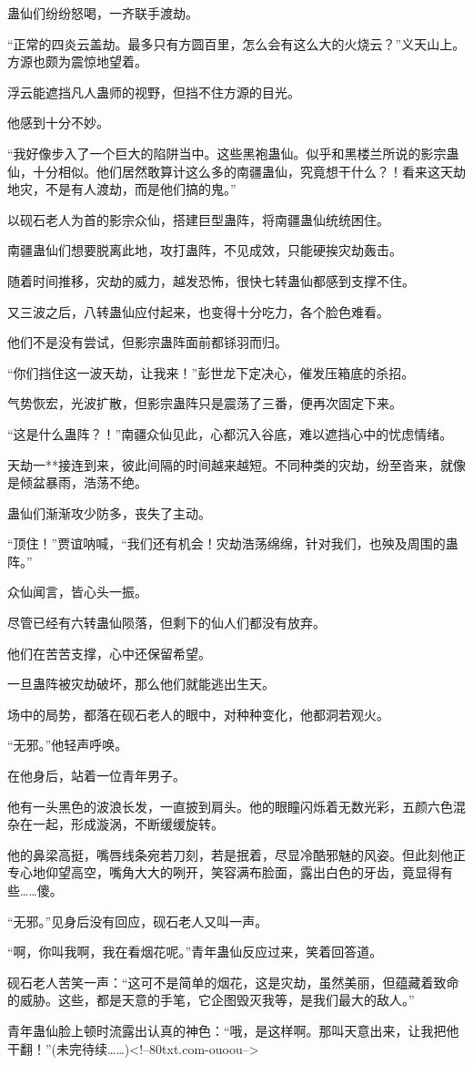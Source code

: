 \begin{this_body}
蛊仙们纷纷怒喝，一齐联手渡劫。

“正常的四炎云盖劫。最多只有方圆百里，怎么会有这么大的火烧云？”义天山上。方源也颇为震惊地望着。

浮云能遮挡凡人蛊师的视野，但挡不住方源的目光。

他感到十分不妙。

“我好像步入了一个巨大的陷阱当中。这些黑袍蛊仙。似乎和黑楼兰所说的影宗蛊仙，十分相似。他们居然敢算计这么多的南疆蛊仙，究竟想干什么？！看来这天劫地灾，不是有人渡劫，而是他们搞的鬼。”

以砚石老人为首的影宗众仙，搭建巨型蛊阵，将南疆蛊仙统统困住。

南疆蛊仙们想要脱离此地，攻打蛊阵，不见成效，只能硬挨灾劫轰击。

随着时间推移，灾劫的威力，越发恐怖，很快七转蛊仙都感到支撑不住。

又三波之后，八转蛊仙应付起来，也变得十分吃力，各个脸色难看。

他们不是没有尝试，但影宗蛊阵面前都铩羽而归。

“你们挡住这一波天劫，让我来！”彭世龙下定决心，催发压箱底的杀招。

气势恢宏，光波扩散，但影宗蛊阵只是震荡了三番，便再次固定下来。

“这是什么蛊阵？！”南疆众仙见此，心都沉入谷底，难以遮挡心中的忧虑情绪。

天劫一**接连到来，彼此间隔的时间越来越短。不同种类的灾劫，纷至沓来，就像是倾盆暴雨，浩荡不绝。

蛊仙们渐渐攻少防多，丧失了主动。

“顶住！”贾谊呐喊，“我们还有机会！灾劫浩荡绵绵，针对我们，也殃及周围的蛊阵。”

众仙闻言，皆心头一振。

尽管已经有六转蛊仙陨落，但剩下的仙人们都没有放弃。

他们在苦苦支撑，心中还保留希望。

一旦蛊阵被灾劫破坏，那么他们就能逃出生天。

场中的局势，都落在砚石老人的眼中，对种种变化，他都洞若观火。

“无邪。”他轻声呼唤。

在他身后，站着一位青年男子。

他有一头黑色的波浪长发，一直披到肩头。他的眼瞳闪烁着无数光彩，五颜六色混杂在一起，形成漩涡，不断缓缓旋转。

他的鼻梁高挺，嘴唇线条宛若刀刻，若是抿着，尽显冷酷邪魅的风姿。但此刻他正专心地仰望高空，嘴角大大的咧开，笑容满布脸面，露出白色的牙齿，竟显得有些……傻。

“无邪。”见身后没有回应，砚石老人又叫一声。

“啊，你叫我啊，我在看烟花呢。”青年蛊仙反应过来，笑着回答道。

砚石老人苦笑一声：“这可不是简单的烟花，这是灾劫，虽然美丽，但蕴藏着致命的威胁。这些，都是天意的手笔，它企图毁灭我等，是我们最大的敌人。”

青年蛊仙脸上顿时流露出认真的神色：“哦，是这样啊。那叫天意出来，让我把他干翻！”(未完待续……)<!--80txt.com-ouoou-->

\end{this_body}

